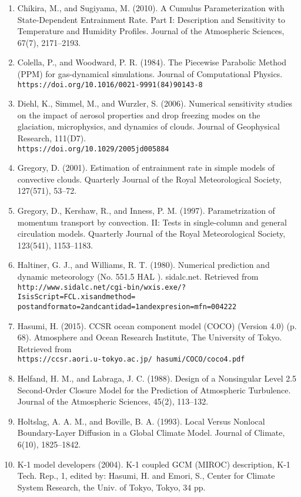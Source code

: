 \begin{enumerate}
\item Chikira, M., and Sugiyama, M. (2010). A Cumulus Parameterization with State-Dependent Entrainment Rate. Part I: Description and Sensitivity to Temperature and Humidity Profiles. Journal of the Atmospheric Sciences, 67(7), 2171–2193.
\item Colella, P., and Woodward, P. R. (1984). The Piecewise Parabolic Method (PPM) for gas-dynamical simulations. Journal of Computational Physics. \\
\texttt{https://doi.org/10.1016/0021-9991(84)90143-8}
\item Diehl, K., Simmel, M., and Wurzler, S. (2006). Numerical sensitivity studies on the impact of aerosol properties and drop freezing modes on the glaciation, microphysics, and dynamics of clouds. Journal of Geophysical Research, 111(D7). \\
\texttt{https://doi.org/10.1029/2005jd005884}
\item Gregory, D. (2001). Estimation of entrainment rate in simple models of convective clouds. Quarterly Journal of the Royal Meteorological Society, 127(571), 53–72.
\item Gregory, D., Kershaw, R., and Inness, P. M. (1997). Parametrization of momentum transport by convection. II: Tests in single-column and general circulation models. Quarterly Journal of the Royal Meteorological Society, 123(541), 1153–1183.
\item Haltiner, G. J., and Williams, R. T. (1980). Numerical prediction and dynamic meteorology (No. 551.5 HAL ). sidalc.net. Retrieved from \\
\texttt{http://www.sidalc.net/cgi-bin/wxis.exe/?IsisScript=FCL.xisandmethod=\\
postandformato=2andcantidad=1andexpresion=mfn=004222}
\item Hasumi, H. (2015). CCSR ocean component model (COCO) (Version 4.0) (p. 68). Atmosphere and Ocean Research Institute, The University of Tokyo. Retrieved from \\
\texttt{https://ccsr.aori.u-tokyo.ac.jp/~hasumi/COCO/coco4.pdf}
\item Helfand, H. M., and Labraga, J. C. (1988). Design of a Nonsingular Level 2.5 Second-Order Closure Model for the Prediction of Atmospheric Turbulence. Journal of the Atmospheric Sciences, 45(2), 113–132.
\item Holtslag, A. A. M., and Boville, B. A. (1993). Local Versus Nonlocal Boundary-Layer Diffusion in a Global Climate Model. Journal of Climate, 6(10), 1825–1842.
\item K-1 model developers (2004). K-1 coupled GCM (MIROC) description, K-1 Tech. Rep., 1, edited by: Hasumi, H. and Emori, S., Center for Climate System Research, the Univ. of Tokyo, Tokyo, 34 pp.

\end{enumerate}
